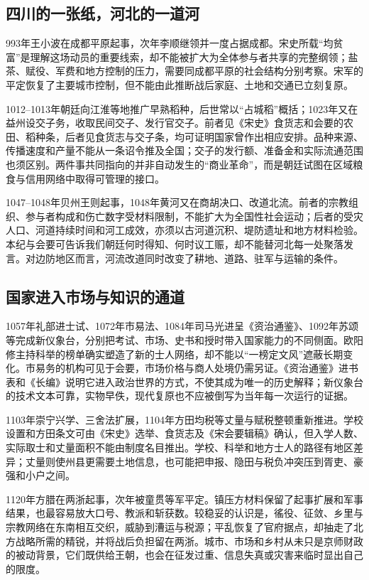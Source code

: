 \subsection{四川的一张纸，河北的一道河}

993年王小波在成都平原起事，次年李顺继领并一度占据成都。宋史所载“均贫富”是理解这场动员的重要线索，却不能被扩大为全体参与者共享的完整纲领；盐茶、赋役、军费和地方控制的压力，需要同成都平原的社会结构分别考察。宋军的平定恢复了主要城市控制，但不能由此推断战后家庭、土地和交通已立刻复原。

1012--1013年朝廷向江淮等地推广早熟稻种，后世常以“占城稻”概括；1023年又在益州设交子务，收取民间交子、发行官交子。前者见《宋史》食货志和会要的农田、稻种条，后者见食货志与交子条，均可证明国家曾作出相应安排。品种来源、传播速度和产量不能从一条诏令推及全国；交子的发行额、准备金和实际流通范围也须区别。两件事共同指向的并非自动发生的“商业革命”，而是朝廷试图在区域粮食与信用网络中取得可管理的接口。

1047--1048年贝州王则起事，1048年黄河又在商胡决口、改道北流。前者的宗教组织、参与者构成和伤亡数字受材料限制，不能扩大为全国性社会运动；后者的受灾人口、河道持续时间和河工成效，亦须以古河道沉积、堤防遗址和地方材料检验。本纪与会要可告诉我们朝廷何时得知、何时议工赈，却不能替河北每一处聚落发言。对边防地区而言，河流改道同时改变了耕地、道路、驻军与运输的条件。

\subsection{国家进入市场与知识的通道}

1057年礼部进士试、1072年市易法、1084年司马光进呈《资治通鉴》、1092年苏颂等完成新仪象台，分别把考试、市场、史书和授时带入国家能力的不同侧面。欧阳修主持科举的榜单确实塑造了新的士人网络，却不能以“一榜定文风”遮蔽长期变化。市易务的机构可见于会要，市场价格与商人处境仍需另证。《资治通鉴》进书表和《长编》说明它进入政治世界的方式，不使其成为唯一的历史解释；新仪象台的技术文本可靠，实物早佚，现代复原也不应被倒写为当年每一次运行的证据。

1103年崇宁兴学、三舍法扩展，1104年方田均税等丈量与赋税整顿重新推进。学校设置和方田条文可由《宋史》选举、食货志及《宋会要辑稿》确认，但入学人数、实际取士和丈量面积不能由制度名目推出。学校、科举和地方士人的路径有地区差异；丈量则使州县更需要土地信息，也可能把申报、隐田与税负冲突压到胥吏、豪强和小户之间。

1120年方腊在两浙起事，次年被童贯等军平定。镇压方材料保留了起事扩展和军事结果，也最容易放大口号、教派和斩获数。较稳妥的认识是，徭役、征敛、乡里与宗教网络在东南相互交织，威胁到漕运与税源；平乱恢复了官府据点，却抽走了北方战略所需的精锐，并将战后负担留在两浙。城市、市场和乡村从未只是京师财政的被动背景，它们既供给王朝，也会在征发过重、信息失真或灾害来临时显出自己的限度。
